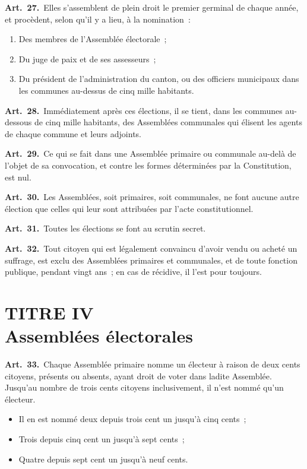 \documentclass[french,twoside]{book} %
\newcommand{\labelchar}[1]{\textbf{\color{rubric} #1}}
\begin{document}
\labelchar{Art. 27.} Elles s’assemblent de plein droit le premier germinal de chaque année, et procèdent, selon qu’il y a lieu, à la nomination :\par

\begin{enumerate}[itemsep=0pt,topsep=0pt,partopsep=0pt,parskip=0pt]
\item Des membres de l’Assemblée électorale ;
\item Du juge de paix et de ses assesseurs ;
\item Du président de l’administration du canton, ou des officiers municipaux dans les communes au-dessus de cinq mille habitants.
\end{enumerate}

\labelchar{Art. 28.} Immédiatement après ces élections, il se tient, dans les communes au-dessous de cinq mille habitants, des Assemblées communales qui élisent les agents de chaque commune et leurs adjoints.\par
\labelchar{Art. 29.} Ce qui se fait dans une Assemblée primaire ou communale au-delà de l’objet de sa convocation, et contre les formes déterminées par la Constitution, est nul.\par
\labelchar{Art. 30.} Les Assemblées, soit primaires, soit communales, ne font aucune autre élection que celles qui leur sont attribuées par l’acte constitutionnel.\par
\labelchar{Art. 31.} Toutes les élections se font au scrutin secret.\par
\labelchar{Art. 32.} Tout citoyen qui est légalement convaincu d’avoir vendu ou acheté un suffrage, est exclu des Assemblées primaires et communales, et de toute fonction publique, pendant vingt ans ; en cas de récidive, il l’est pour toujours.

\section[{TITRE IV. Assemblées électorales}]{TITRE IV \\
Assemblées électorales}

\labelchar{Art. 33.} Chaque Assemblée primaire nomme un électeur à raison de deux cents citoyens, présents ou absents, ayant droit de voter dans ladite Assemblée. Jusqu’au nombre de trois cents citoyens inclusivement, il n’est nommé qu’un électeur.\par

\begin{itemize}[itemsep=0pt,topsep=0pt,partopsep=0pt,parskip=0pt]
\item Il en est nommé deux depuis trois cent un jusqu’à cinq cents ;
\item Trois depuis cinq cent un jusqu’à sept cents ;
\item Quatre depuis sept cent un jusqu’à neuf cents.
\end{itemize}
\end{document}
